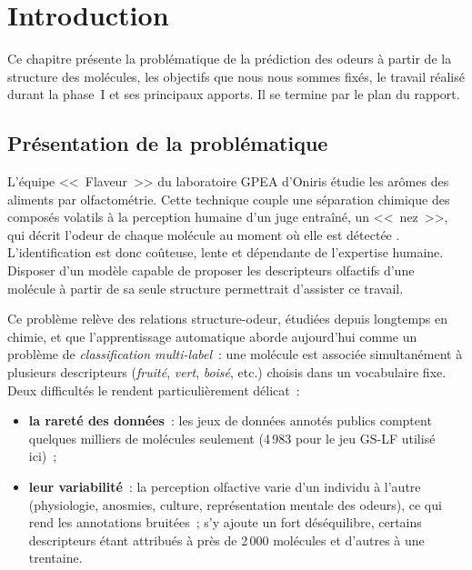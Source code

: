 \chapter{Introduction}
\label{chap:Introduction}

Ce chapitre présente la problématique de la prédiction des odeurs à partir de la structure des molécules, les objectifs que nous nous sommes fixés, le travail réalisé durant la phase~I et ses principaux apports.
Il se termine par le plan du rapport.


\section{Présentation de la problématique}
\label{sec:Problematique}

L'équipe <<~Flaveur~>> du laboratoire GPEA d'Oniris étudie les arômes des aliments par olfactométrie.
Cette technique couple une séparation chimique des composés volatils à la perception humaine d'un juge entraîné, un <<~nez~>>, qui décrit l'odeur de chaque molécule au moment où elle est détectée \cite{Meierhenrich-2005}.
L'identification est donc coûteuse, lente et dépendante de l'expertise humaine.
Disposer d'un modèle capable de proposer les descripteurs olfactifs d'une molécule à partir de sa seule structure permettrait d'assister ce travail.

Ce problème relève des relations structure-odeur, étudiées depuis longtemps en chimie, et que l'apprentissage automatique aborde aujourd'hui comme un problème de \emph{classification multi-label}~: une molécule est associée simultanément à plusieurs descripteurs (\emph{fruité}, \emph{vert}, \emph{boisé}, etc.) choisis dans un vocabulaire fixe.
Deux difficultés le rendent particulièrement délicat~:
\begin{itemize}
   \item \textbf{la rareté des données}~: les jeux de données annotés publics comptent quelques milliers de molécules seulement (4\,983 pour le jeu GS-LF utilisé ici)~;
   \item \textbf{leur variabilité}~: la perception olfactive varie d'un individu à l'autre (physiologie, anosmies, culture, représentation mentale des odeurs), ce qui rend les annotations bruitées~; s'y ajoute un fort déséquilibre, certains descripteurs étant attribués à près de 2\,000 molécules et d'autres à une trentaine.
\end{itemize}

